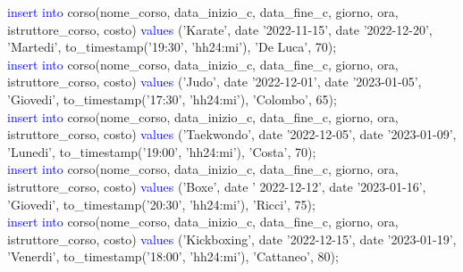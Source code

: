\documentclass{article}
\begin{document}
\begin{flushleft}
{        \vspace{2mm}
        \hspace*{0.5em}\textcolor{blue}{insert into} corso(nome\_corso, data\_inizio\_c, data\_fine\_c, giorno, ora, \hspace*{0.0em} istruttore\_corso, costo) \textcolor{blue}{values} ('Karate', date '2022-11-15', date '2022-12-20', \hspace*{0.4em}'Martedi', to\_timestamp('19:30', 'hh24:mi'), 'De Luca', 70); \\
        \vspace{2mm}
        \hspace*{0.5em}\textcolor{blue}{insert into} corso(nome\_corso, data\_inizio\_c, data\_fine\_c, giorno, ora, \hspace*{0.0em} istruttore\_corso, costo) \textcolor{blue}{values} ('Judo', date '2022-12-01', date '2023-01-05', \hspace*{0.4em}'Giovedi', to\_timestamp('17:30', 'hh24:mi'), 'Colombo', 65); \\
        \newpage
        \hspace*{0.5em}\textcolor{blue}{insert into} corso(nome\_corso, data\_inizio\_c, data\_fine\_c, giorno, ora, \hspace*{0.0em} istruttore\_corso, costo) \textcolor{blue}{values} ('Taekwondo', date '2022-12-05', date \hspace*{0.4em}'2023-01-09', 'Lunedi', to\_timestamp('19:00', 'hh24:mi'), 'Costa', 70); \\
        \vspace{2mm}
        \hspace*{0.5em}\textcolor{blue}{insert into} corso(nome\_corso, data\_inizio\_c, data\_fine\_c, giorno, ora, \hspace*{0.0em} istruttore\_corso, costo) \textcolor{blue}{values} ('Boxe', date ' 2022-12-12', date '2023-01-16', \hspace*{0.4em}'Giovedi', to\_timestamp('20:30', 'hh24:mi'), 'Ricci', 75); \\
        \vspace{2mm}
        \hspace*{0.5em}\textcolor{blue}{insert into} corso(nome\_corso, data\_inizio\_c, data\_fine\_c, giorno, ora, \hspace*{0.0em} istruttore\_corso, costo) \textcolor{blue}{values} ('Kickboxing', date '2022-12-15', date \hspace*{0.4em}'2023-01-19', 'Venerdi', to\_timestamp('18:00', 'hh24:mi'), 'Cattaneo', 80); \\
}
\end{flushleft}
\end{document}
